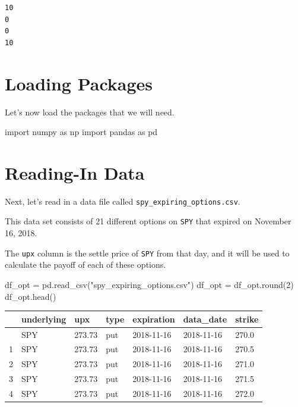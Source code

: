 \documentclass[
  letterpaper,
  DIV=11,
  numbers=noendperiod]{scrreprt}
\newenvironment{Shaded}{\begin{snugshade}}{\end{snugshade}}
\newcommand{\BuiltInTok}[1]{\textcolor[rgb]{0.00,0.23,0.31}{#1}}
\newcommand{\DecValTok}[1]{\textcolor[rgb]{0.68,0.00,0.00}{#1}}
\newcommand{\ImportTok}[1]{\textcolor[rgb]{0.00,0.46,0.62}{#1}}
\newcommand{\NormalTok}[1]{\textcolor[rgb]{0.00,0.23,0.31}{#1}}
\newcommand{\OperatorTok}[1]{\textcolor[rgb]{0.37,0.37,0.37}{#1}}
\newcommand{\StringTok}[1]{\textcolor[rgb]{0.13,0.47,0.30}{#1}}
\begin{document}
\begin{verbatim}
10
0
0
10
\end{verbatim}

\hypertarget{loading-packages}{%
\section{Loading Packages}\label{loading-packages}}

Let's now load the packages that we will need.

\begin{Shaded}
\begin{Highlighting}[]
\ImportTok{import}\NormalTok{ numpy }\ImportTok{as}\NormalTok{ np}
\ImportTok{import}\NormalTok{ pandas }\ImportTok{as}\NormalTok{ pd}
\end{Highlighting}
\end{Shaded}

\hypertarget{reading-in-data-3}{%
\section{Reading-In Data}\label{reading-in-data-3}}

Next, let's read in a data file called
\texttt{spy\_expiring\_options.csv}.

This data set consists of 21 different options on \texttt{SPY} that
expired on November 16, 2018.

The \texttt{upx} column is the settle price of \texttt{SPY} from that
day, and it will be used to calculate the payoff of each of these
options.

\begin{Shaded}
\begin{Highlighting}[]
\NormalTok{df\_opt }\OperatorTok{=}\NormalTok{ pd.read\_csv(}\StringTok{"spy\_expiring\_options.csv"}\NormalTok{)}
\NormalTok{df\_opt }\OperatorTok{=}\NormalTok{ df\_opt.}\BuiltInTok{round}\NormalTok{(}\DecValTok{2}\NormalTok{)}
\NormalTok{df\_opt.head()}
\end{Highlighting}
\end{Shaded}

\begin{longtable}[]{@{}lllllll@{}}
\toprule\noalign{}
& underlying & upx & type & expiration & data\_date & strike \\
\midrule\noalign{}
\endhead
\bottomrule\noalign{}
\endlastfoot
0 & SPY & 273.73 & put & 2018-11-16 & 2018-11-16 & 270.0 \\
1 & SPY & 273.73 & put & 2018-11-16 & 2018-11-16 & 270.5 \\
2 & SPY & 273.73 & put & 2018-11-16 & 2018-11-16 & 271.0 \\
3 & SPY & 273.73 & put & 2018-11-16 & 2018-11-16 & 271.5 \\
4 & SPY & 273.73 & put & 2018-11-16 & 2018-11-16 & 272.0 \\
\end{longtable}
\end{document}
